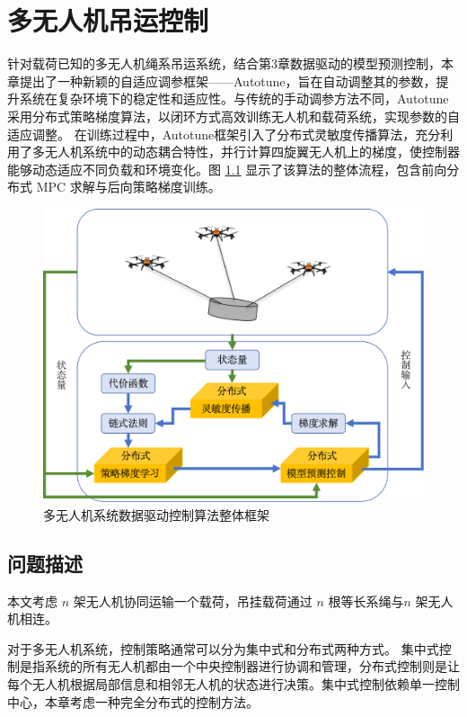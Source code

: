 \documentclass[lang=chs, degree=master, blindreview=true, winfonts=true]{yanputhesis}
\begin{document}
\cleardoublepage

\chapter{多无人机吊运控制}

针对载荷已知的多无人机绳系吊运系统，结合第3章数据驱动的模型预测控制，本章提出了一种新颖的自适应调参框架——Autotune，旨在自动调整其的参数，提升系统在复杂环境下的稳定性和适应性。与传统的手动调参方法不同，Autotune采用分布式策略梯度算法，以闭环方式高效训练无人机和载荷系统，实现参数的自适应调整。
在训练过程中，Autotune框架引入了分布式灵敏度传播算法，充分利用了多无人机系统中的动态耦合特性，并行计算四旋翼无人机上的梯度，使控制器能够动态适应不同负载和环境变化​。图 \ref{4_1} 显示了该算法的整体流程，包含前向分布式 MPC 求解与后向策略梯度训练。

\begin{figure}[hbt!]
	\centering
	\includegraphics[width=34pc]{picture/4_1.png} 
	\caption{多无人机系统数据驱动控制算法整体框架} 
	\label{4_1}
\end{figure}


\section{问题描述}
本文考虑 $n$ 架无人机协同运输一个载荷，吊挂载荷通过 $n$ 根等长系绳与$n$ 架无人机相连。

对于多无人机系统，控制策略通常可以分为集中式和分布式两种方式。
集中式控制是指系统的所有无人机都由一个中央控制器进行协调和管理，分布式控制则是让每个无人机根据局部信息和相邻无人机的状态进行决策。集中式控制依赖单一控制中心，本章考虑一种完全分布式的控制方法。
\end{document}
